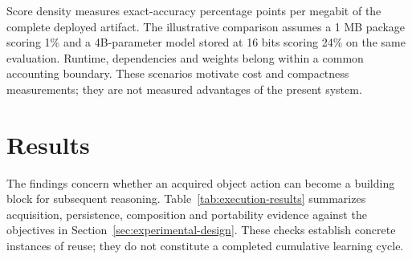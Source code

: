 \documentclass[11pt]{article}
\begin{document}
Score density measures exact-accuracy percentage points per megabit of the complete deployed artifact. The illustrative comparison assumes a 1 MB package scoring 1\% and a 4B-parameter model stored at 16 bits scoring 24\% on the same evaluation. Runtime, dependencies and weights belong within a common accounting boundary. These scenarios motivate cost and compactness measurements; they are not measured advantages of the present system.

\section{Results}\label{sec:results}
The findings concern whether an acquired object action can become a building block for subsequent reasoning. Table~\ref{tab:execution-results} summarizes acquisition, persistence, composition and portability evidence against the objectives in Section~\ref{sec:experimental-design}. These checks establish concrete instances of reuse; they do not constitute a completed cumulative learning cycle.
\end{document}
